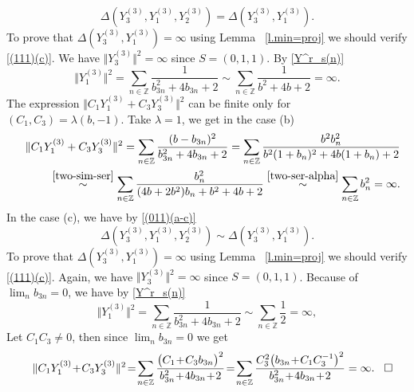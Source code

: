 \documentclass[preprint,12pt]{elsarticle}
\numberwithin{equation}{section}
\begin{document}
\begin{pf}
\begin{equation*}
 \Delta(Y_3^{(3)},Y_1^{(3)},Y_2^{(3)})=
 \Delta(Y_3^{(3)},Y_1^{(3)}).
\end{equation*}
To prove that $ \Delta(Y_3^{(3)},Y_1^{(3)})=\infty$ using Lemma~
\ref{l.min=proj} we should verify \eqref{(111)(c)}.
We have  $\Vert Y_3^{(3)}\Vert^2=\infty$ since $S=(0,1,1)$. By \eqref{Y^r_s(n)} 
%
\begin{equation*}
\Vert Y_1^{(3)}\Vert^2\!=\!
\sum_{n\in \mathbb Z}\frac{1}{b^2_{3n}+4b_{3n}+2}\!\sim\!
\sum_{n\in \mathbb Z}\frac{1}{b^2+4b+2}\!=
\!\infty.
\end{equation*}
%
The expression $\Vert C_1Y_1^{(3)}+C_3Y_3^{(3)}\Vert^2$ can be finite only for  $(C_1,C_3)=\lambda(b,-1)$. Take 
$\lambda=1$, we get in the case (b)
\begin{eqnarray*}
 &&
 \Vert C_1Y_1^{(3)}+C_3Y_3^{(3)}\Vert^2=\sum_{n\in \mathbb Z}\frac{(b-b_{3n})^2}{b^2_{3n}+4b_{3n}+2}=
\sum_{n\in \mathbb Z}\frac{b^2b_n^2}{
b^2(1+b_n)^2+4b(1+b_n)+2
}
 \\
&& 
\stackrel{ \eqref{two-sim-ser}}{\sim} \sum_{n\in \mathbb Z}\frac{b_n^2}{
(4b+2b^2)b_{n}+b^2+4b+2
}\stackrel{ \eqref{two-ser-alpha}}{\sim}
\sum_{n\in \mathbb Z}b_n^2=\infty.
\end{eqnarray*}
%
In the case (c),  
we have by \eqref{(011)(a-c)} 
\begin{equation*} 
\Delta(Y_3^{(3)},Y_1^{(3)},Y_2^{(3)})
\sim
\Delta(Y_3^{(3)},Y_1^{(3)}).
\end{equation*}
To prove that $ \Delta(Y_3^{(3)},Y_1^{(3)})=\infty$ using Lemma~
\ref{l.min=proj} we should verify \eqref{(111)(c)}.
Again, we have  $\Vert Y_3^{(3)}\Vert^2=\infty$ since $S=(0,1,1)$.  Because of $\lim_nb_{3n}=0$, we have  by \eqref{Y^r_s(n)}  
\begin{equation*}
\Vert Y_1^{(3)} \Vert^2=\sum_{n\in \mathbb Z}\frac{1}{b^2_{3n}+4b_{3n}+2}\sim \sum_{n\in \mathbb Z}\frac{1}{2}
=\infty,
\end{equation*}
Let $C_1C_3\not=0$, then 
since $\lim_nb_{3n}=0$ we get
\begin{eqnarray*}
 &&
\Vert C_1 Y_1^{(3)}\!+\!C_3 Y_3^{(3)}\Vert^2\!=\!
 \sum_{n\in \mathbb Z}\frac{\big(C_1\!+\!C_3b_{3n}\big)^2}{b^2_{3n}\!+\!4b_{3n}\!+\!2}\!=\!
 \sum_{n\in \mathbb Z}\frac{C_3^2\big(b_{3n}\!+\!C_1C_3^{-1}\big)^2}{b^2_{3n}\!+\!4b_{3n}\!+\!2}=\infty. 
\hskip 0.3cm\Box
\end{eqnarray*}
\end{pf}
%
\end{document}
